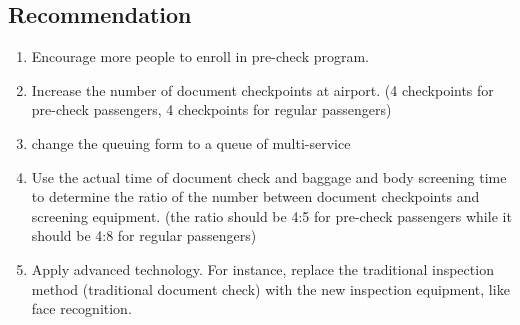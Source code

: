 \documentclass{mcmthesis}
\begin{document}
\subsection*{Recommendation}
\begin{enumerate}[1:]
\item Encourage more people to enroll in pre-check program.
\item Increase the number of document checkpoints at airport. (4 checkpoints for pre-check passengers, 4 checkpoints for regular passengers)
\item change the queuing form to a queue of multi-service
\item Use the actual time of document check and baggage and body screening time to determine the ratio of the number between document checkpoints and screening equipment. (the ratio should be 4:5 for pre-check passengers while it should be 4:8 for regular passengers)
\item Apply advanced technology. For instance, replace the traditional inspection method (traditional document check) with the new inspection equipment, like face recognition.	
\end{enumerate}
\end{document}
